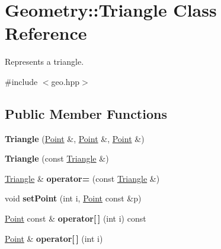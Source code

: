 \hypertarget{classGeometry_1_1Triangle}{\section{Geometry\-:\-:Triangle Class Reference}
\label{classGeometry_1_1Triangle}
}


Represents a triangle.  




{\ttfamily \#include $<$geo.\-hpp$>$}

\subsection*{Public Member Functions}
\begin{DoxyCompactItemize}
\item 
\hypertarget{classGeometry_1_1Triangle_ab59153165d58549d12bac1dda5981135}{{\bfseries Triangle} (\hyperlink{classGeometry_1_1Point}{Point} \&, \hyperlink{classGeometry_1_1Point}{Point} \&, \hyperlink{classGeometry_1_1Point}{Point} \&)}\label{classGeometry_1_1Triangle_ab59153165d58549d12bac1dda5981135}

\item 
\hypertarget{classGeometry_1_1Triangle_a033a17904b374cc576dd964fb0276304}{{\bfseries Triangle} (const \hyperlink{classGeometry_1_1Triangle}{Triangle} \&)}\label{classGeometry_1_1Triangle_a033a17904b374cc576dd964fb0276304}

\item 
\hypertarget{classGeometry_1_1Triangle_a30929a6792a8b7cee7934b7e90f16d3a}{\hyperlink{classGeometry_1_1Triangle}{Triangle} \& {\bfseries operator=} (const \hyperlink{classGeometry_1_1Triangle}{Triangle} \&)}\label{classGeometry_1_1Triangle_a30929a6792a8b7cee7934b7e90f16d3a}

\item 
\hypertarget{classGeometry_1_1Triangle_aa44bc9b593a1375068b3f75d23e63f44}{void {\bfseries set\-Point} (int i, \hyperlink{classGeometry_1_1Point}{Point} const \&p)}\label{classGeometry_1_1Triangle_aa44bc9b593a1375068b3f75d23e63f44}

\item 
\hypertarget{classGeometry_1_1Triangle_a27548786fce9e29761a8852ae376cfd8}{\hyperlink{classGeometry_1_1Point}{Point} const \& {\bfseries operator\mbox{[}$\,$\mbox{]}} (int i) const }\label{classGeometry_1_1Triangle_a27548786fce9e29761a8852ae376cfd8}

\item 
\hypertarget{classGeometry_1_1Triangle_a8f5dcaa5c95c749f1e43fb74ff2f4c8e}{\hyperlink{classGeometry_1_1Point}{Point} \& {\bfseries operator\mbox{[}$\,$\mbox{]}} (int i)}\label{classGeometry_1_1Triangle_a8f5dcaa5c95c749f1e43fb74ff2f4c8e}


\end{DoxyCompactItemize}
